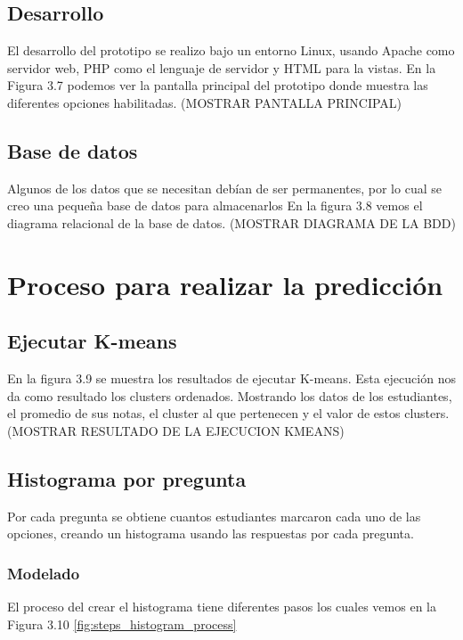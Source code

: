 \subsection{Desarrollo}

El desarrollo del prototipo se realizo bajo un entorno Linux, usando Apache como servidor web, PHP como el lenguaje de servidor y HTML para la vistas. En la Figura 3.7 podemos ver la pantalla principal del prototipo donde muestra las diferentes opciones habilitadas. (MOSTRAR PANTALLA PRINCIPAL)

\subsection{Base de datos}
Algunos de los datos que se necesitan debían de ser permanentes, por lo cual se creo una pequeña base de datos para almacenarlos En la figura 3.8 vemos el diagrama relacional de la base de datos. (MOSTRAR DIAGRAMA DE LA BDD)


\section{Proceso para realizar la predicción} 

\subsection{Ejecutar K-means}

En la figura 3.9 se muestra los resultados de ejecutar K-means. Esta ejecución nos da como resultado los clusters ordenados. Mostrando los datos de los estudiantes, el promedio de sus notas, el cluster al que pertenecen y el valor de estos clusters.
(MOSTRAR RESULTADO DE LA EJECUCION KMEANS)

\subsection{Histograma por pregunta}

Por cada pregunta se obtiene cuantos estudiantes marcaron cada uno de las opciones, creando un histograma usando las respuestas por cada pregunta.

\subsubsection{Modelado}

El proceso del crear el histograma tiene diferentes pasos los cuales vemos en la Figura 3.10 \ref{fig:steps_histogram_process}

